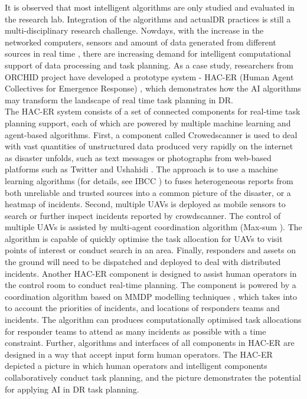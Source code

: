 It is observed that most intelligent algorithms are only studied and evaluated in the research lab. Integration of the algorithms and actual\ac{DR} practices is still a multi-disciplinary research challenge. Nowdays, with the increase in the networked computers, sensors and amount of data generated from different sources in real time \cite{Ramchurn2015}, there are increasing demand for intelligent computational support of data processing and task planning. As a case study, researchers from ORCHID project have developed a prototype system - HAC-ER (Human Agent Collectives for Emergence Response) \cite{Jennings2014,Ramchurn2015,Ramchurn2015a}, which demonstrates how the \ac{AI} algorithms may transform the landscape of real time task planning in \ac{DR}.\\

The \ac{HAC-ER} system consists of a set of connected components for real-time task planning support, each of which are powered by multiple machine learning and agent-based algorithms. First, a component called Crowedscanner is used to deal with vast quantities of unstructured data produced very rapidly on the internet as disaster unfolds, such as text messages or photographs from web-based platforms such as Twitter and Ushahidi \cite{Morrow2011}. The approach is to use a machine learning algorithms (for details, see IBCC \cite{Simpson}) to fuses heterogeneous reports from both unreliable and trusted sources into a common picture of the disaster, or a heatmap of incidents. Second, multiple  \acf{UAV}s is deployed as mobile sensors to search or further inspect incidents reported by crowdscanner. The control of multiple \ac{UAV}s is assisted by multi-agent coordination algorithm (Max-sum \cite{Ramchurn2010}). The algorithm is capable of quickly optimise the task allocation for \ac{UAV}s to visit points of interest or conduct search in an area.  Finally, responders and assets on the ground will need to be dispatched and deployed to deal with distributed incidents. Another \ac{HAC-ER} component is designed to assist human operators in the control room to conduct real-time planning. The component is powered by a coordination algorithm based on MMDP modelling techniques \cite{Wu2015}, which takes into to account the priorities of incidents, and locations of responders teams and incidents. The algorithm can produces computationally optimised task allocations for responder teams to attend as many incidents as possible with a time constraint. Further, algorithms and interfaces of all components in \ac{HAC-ER} are designed in a way that accept input form human operators. The \ac{HAC-ER} depicted a picture in which human operators and intelligent components collaboratively conduct task planning, and the picture demonstrates the potential for applying \ac{AI} in \ac{DR} task planning.\\

